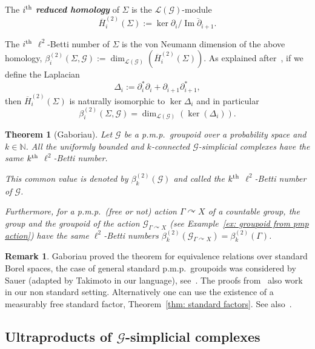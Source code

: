 \documentclass[10pt]{amsart}
\newtheorem{theo}[cdrthm]{Theorem}
\theoremstyle{definition}
\newtheorem{rema}[cdrthm]{Remark}
\newcommand{\defin}[1]{\textbf{\emph{#1}}}
\newcommand{\Nmath}{\mathbb{N}}
\newcommand{\acting}{\curvearrowright}
\newcommand{\LL}{\mathcal{L}}
\newcommand{\cg}{\mathcal{G}}
\DeclareMathOperator{\Ima}{Im}
\newcommand{\pmp}{p.m.p.\ }
\newcommand{\lvN}{\mathcal{L}(\cg)}
\begin{document}
The $i^{\rm th}$ \defin{reduced homology} of $\Sigma$ is the $\lvN$-module
\[
\overline H_i^{(2)}(\Sigma) := \ker \partial_i / \overline{\Ima \partial_{i+1}}.
\]

The $i^{\rm th}$ $\ell^2$-Betti number of $\Sigma$ is the von Neumann dimension of the above homology, $\beta^{(2)}_i(\Sigma,\cg):=\dim_{\LL(\cg)}(\overline H_i^{(2)}(\Sigma))$. As explained after~\cite[Definition~3.6]{gab_ihes}, if we define the Laplacian
\[
\Delta_i:=\partial_i^*\partial_i+\partial_{i+1}\partial_{i+1}^*,
\]
then $\overline H_i^{(2)}(\Sigma)$ is naturally isomorphic to $\ker\Delta_i$ and in particular
\[
\beta^{(2)}_i(\Sigma,\cg)=\dim_{\LL(\cg)}(\ker(\Delta_i)).
\]

\begin{theo}[Gaboriau]\label{thm:bettibound}
Let $\cg$ be a \pmp groupoid over a probability space and $k\in\Nmath$. All the uniformly bounded and $k$-connected $\cg$-simplicial complexes have the same $k^{\rm th}$ $\ell^2$-Betti number.


This common value is denoted by $\beta^{(2)}_k(\cg)$ and called the $k^{\rm th}$ $\ell^2$-Betti number of $\cg$.

Furthermore, for a \pmp (free or not) action $\Gamma\acting X$ of a countable group, the group and the groupoid of the action $\cg_{\Gamma\acting X}$ (see Example~\ref{ex: groupoid from pmp action}) have the same $\ell^2$-Betti numbers $\beta^{(2)}_k(\cg_{\Gamma\acting X})=\beta^{(2)}_k(\Gamma)$.
\end{theo}



\begin{rema}
Gaboriau proved the theorem for equivalence relations over standard Borel spaces, the case of general standard \pmp groupoids was considered by Sauer (adapted by Takimoto in our language), see~\cite{Sauer-Betti-groupoids-2005,Takimoto-cost-L2-2005}. The proofs from~\cite{gab_ihes, Takimoto-cost-L2-2005} also work in our non standard setting. Alternatively one can use the existence of a measurably free standard factor, Theorem~\ref{thm: standard factors}. See also~\cite{Aaserud-Popa}.
\end{rema}

\subsection{\texorpdfstring{Ultraproducts of $\cg$-simplicial complexes}{Ultraproducts of G-simplicial complexes}}\label{sect: ultraprod of cg-simplicial complexes}
\end{document}
